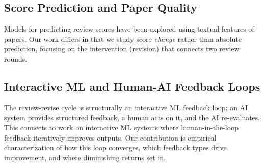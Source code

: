 \subsection{Score Prediction and Paper Quality}

Models for predicting review scores have been explored using textual features of papers. Our work differs in that we study score \emph{change} rather than absolute prediction, focusing on the intervention (revision) that connects two review rounds.

\subsection{Interactive ML and Human-AI Feedback Loops}

The review-revise cycle is structurally an interactive ML feedback loop: an AI system provides structured feedback, a human acts on it, and the AI re-evaluates. This connects to work on interactive ML systems where human-in-the-loop feedback iteratively improves outputs. Our contribution is empirical characterization of how this loop converges, which feedback types drive improvement, and where diminishing returns set in.
